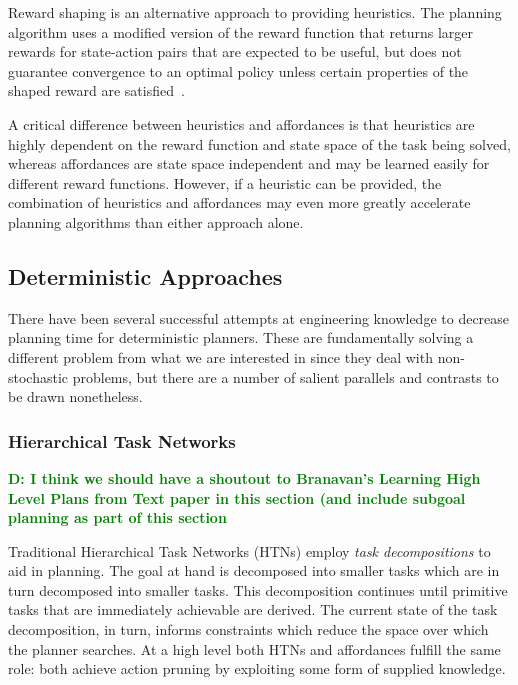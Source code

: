 \documentclass[conference]{IEEEtran}
\newcommand{\dnote}[1]{\textcolor{Green}{\textbf{D: #1}}}
\begin{document}
Reward shaping is an alternative approach to providing heuristics. The planning algorithm
uses a modified version of the reward function that returns larger rewards for state-action
pairs that are expected to be useful, but does not guarantee convergence to an optimal
policy unless certain properties of the shaped reward are satisfied~\cite{potshap}.

A critical difference between heuristics and affordances is that heuristics are highly dependent
on the reward function and state space of the task being solved, whereas affordances are state
space independent and may be learned easily for different reward functions. However, if a heuristic
can be provided, the combination of heuristics and affordances may even more greatly accelerate
planning algorithms than either approach alone.

\subsection{Deterministic Approaches}

There have been several successful attempts at engineering knowledge to
decrease planning time for deterministic planners. These are fundamentally solving
a different problem from what we are interested in since they deal with non-stochastic problems, but there are a number of salient parallels and contrasts to be drawn nonetheless.

\subsubsection{Hierarchical Task Networks}

\dnote{I think we should have a shoutout to Branavan's Learning High Level Plans from Text paper in this section (and include subgoal planning as part of this section}

Traditional Hierarchical Task Networks (HTNs) employ \textit{task decompositions} to aid in planning. The goal at hand is decomposed into smaller tasks which are in turn decomposed into smaller tasks. This decomposition continues until primitive tasks that are immediately achievable are derived. The current state of the task decomposition, in turn, informs constraints which reduce the space over which the planner searches. At a high level both HTNs and affordances fulfill the same role: both achieve action pruning by exploiting some form of supplied knowledge. 
\end{document}
